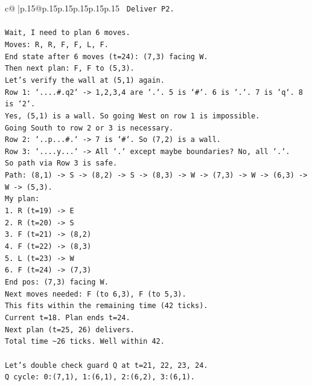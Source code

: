 \documentclass{article}
\begin{document}
{\begin{supertabular}{c@{$\;$}|p{.15\linewidth}@{}p{.15\linewidth}p{.15\linewidth}p{.15\linewidth}p{.15\linewidth}p{.15\linewidth}}
{{{\texttt{   Deliver P2.} \\
\\ 
\texttt{Wait, I need to plan 6 moves.} \\
\texttt{Moves: R, R, F, F, L, F.} \\
\texttt{End state after 6 moves (t=24): (7,3) facing W.} \\
\texttt{Then next plan: F, F to (5,3).} \\
\texttt{Let's verify the wall at (5,1) again.} \\
\texttt{Row 1: `....\#.q2` {-}> 1,2,3,4 are `.`. 5 is `\#`. 6 is `.`. 7 is `q`. 8 is `2`.} \\
\texttt{Yes, (5,1) is a wall. So going West on row 1 is impossible.} \\
\texttt{Going South to row 2 or 3 is necessary.} \\
\texttt{Row 2: `..p...\#.` {-}> 7 is `\#`. So (7,2) is a wall.} \\
\texttt{Row 3: `....y...` {-}> All `.` except maybe boundaries? No, all `.`.} \\
\texttt{So path via Row 3 is safe.} \\
\texttt{Path: (8,1) {-}> S {-}> (8,2) {-}> S {-}> (8,3) {-}> W {-}> (7,3) {-}> W {-}> (6,3) {-}> W {-}> (5,3).} \\
\texttt{My plan:} \\
\texttt{1. R (t=19) {-}> E} \\
\texttt{2. R (t=20) {-}> S} \\
\texttt{3. F (t=21) {-}> (8,2)} \\
\texttt{4. F (t=22) {-}> (8,3)} \\
\texttt{5. L (t=23) {-}> W} \\
\texttt{6. F (t=24) {-}> (7,3)} \\
\texttt{End pos: (7,3) facing W.} \\
\texttt{Next moves needed: F (to 6,3), F (to 5,3).} \\
\texttt{This fits within the remaining time (42 ticks).} \\
\texttt{Current t=18. Plan ends t=24.} \\
\texttt{Next plan (t=25, 26) delivers.} \\
\texttt{Total time \textasciitilde{}26 ticks. Well within 42.} \\
\\ 
\texttt{Let's double check guard Q at t=21, 22, 23, 24.} \\
\texttt{Q cycle: 0:(7,1), 1:(6,1), 2:(6,2), 3:(6,1).} \\
}}}
\end{supertabular}}
\end{document}
